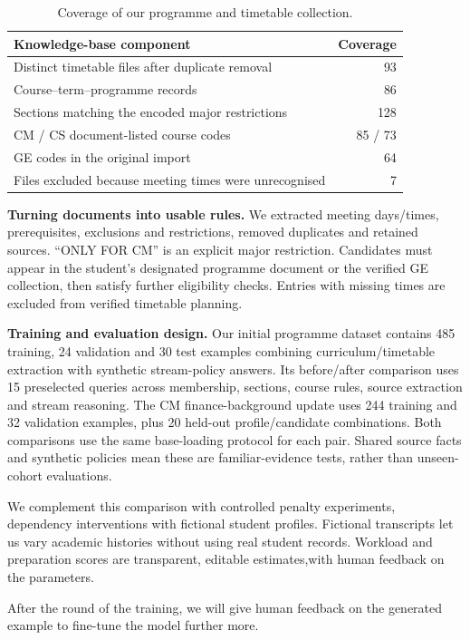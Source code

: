 \documentclass{article}
\begin{document}
\begin{table}[H]
\centering\small
\caption{Coverage of our programme and timetable collection.}
\begin{tabular}{p{3.85in}r}
\toprule
Knowledge-base component & Coverage\\
\midrule
Distinct timetable files after duplicate removal & 93\\
Course--term--programme records & 86\\
Sections matching the encoded major restrictions & 128\\
CM / CS document-listed course codes & 85 / 73\\
GE codes in the original import & 64\\
Files excluded because meeting times were unrecognised & 7\\
\bottomrule
\end{tabular}
\label{tab:data}
\end{table}

\textbf{Turning documents into usable rules.} We extracted meeting days/times, prerequisites, exclusions and restrictions, removed duplicates and retained sources. ``ONLY FOR CM'' is an explicit major restriction. Candidates must appear in the student's designated programme document or the verified GE collection, then satisfy further eligibility checks. Entries with missing times are excluded from verified timetable planning. 

\newpage
\textbf{Training and evaluation design.} Our initial programme dataset contains 485 training, 24 validation and 30 test examples combining curriculum/timetable extraction with synthetic stream-policy answers. Its before/after comparison uses 15 preselected queries across membership, sections, course rules, source extraction and stream reasoning. The CM finance-background update uses 244 training and 32 validation examples, plus 20 held-out profile/candidate combinations. Both comparisons use the same base-loading protocol for each pair. Shared source facts and synthetic policies mean these are familiar-evidence tests, rather than unseen-cohort evaluations.

We complement this comparison with controlled penalty experiments, dependency interventions with fictional student profiles. Fictional transcripts let us vary academic histories without using real student records. Workload and preparation scores are transparent, editable estimates,with human feedback on the parameters. 

After the round of the training, we will give human feedback on the generated example to fine-tune the model further more.
\end{document}
